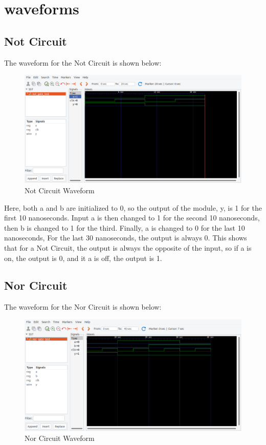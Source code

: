 \documentclass[runningheads, 12pt]{report}
\begin{document}
\chapter{waveforms}

	\section{Not Circuit}

The waveform for the Not Circuit is shown below:
\begin{figure}[h]
	\centering
	\includegraphics[width=1.0\textwidth]{not_gate_wf}
	\caption{Not Circuit Waveform}
	\label{fig: not_gate_wf}
\end{figure}

Here, both a and b are initialized to 0, so the output of the module, y, is 1 for the first 10 nanoseconds. Input a is then changed to 1 for the second 10 nanoseconds, then b is changed to 1 for the third. Finally, a is changed to 0 for the last 10 nanoseconds, For the last 30 nanoseconds, the output is always 0. This shows that for a Not Circuit, the output is always the opposite of the input, so if a is on, the output is 0, and it a is off, the output is 1. %
	\section{Nor Circuit}

The waveform for the Nor Circuit is shown below:
\begin{figure}[h]
	\centering
	\includegraphics[width=1.10\textwidth]{nor_gate_wf}
	\caption{Nor Circuit Waveform}
	\label{fig: nor_gate_wf}
\end{figure}
\end{document}
